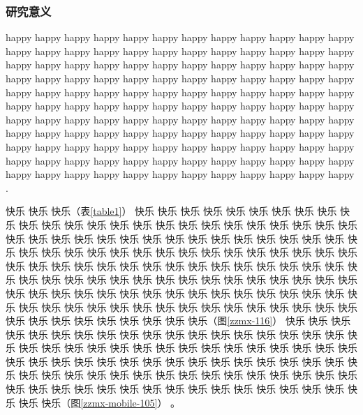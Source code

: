 
\subsubsection{研究意义}

\justifying

\indent\setlength{\parindent}{2em}%

happy happy happy happy happy happy happy happy happy happy happy happy happy happy happy happy happy happy happy happy happy happy happy happy happy happy happy happy happy happy happy happy happy happy happy happy happy happy happy happy happy happy happy happy happy happy happy happy happy happy happy happy happy happy happy happy happy happy happy happy happy happy happy happy happy happy happy happy happy happy happy happy happy happy happy happy happy happy happy happy happy happy happy happy happy happy happy happy happy happy happy happy happy happy happy happy happy happy happy happy happy happy happy happy happy happy happy happy happy happy happy happy happy happy happy happy happy happy happy happy happy happy happy happy happy happy happy happy happy happy happy happy \cite{John1997}.

快乐 快乐 快乐（表\ref{table1}） 快乐 快乐 快乐 快乐 快乐 快乐 快乐 快乐 快乐 快乐 快乐 快乐 快乐 快乐 快乐 快乐 快乐 快乐 快乐 快乐 快乐 快乐 快乐 快乐 快乐 快乐 快乐 快乐 快乐 快乐 快乐 快乐 快乐 快乐 快乐 快乐 快乐 快乐 快乐 快乐 快乐 快乐 快乐 快乐 快乐 快乐 快乐 快乐 快乐 快乐 快乐 快乐 快乐 快乐 快乐 快乐 快乐 快乐 快乐 快乐 快乐 快乐 快乐 快乐 快乐 快乐 快乐 快乐 快乐 快乐 快乐 快乐 快乐 快乐 快乐 快乐 快乐 快乐 快乐 快乐 快乐 快乐 快乐 快乐 快乐 快乐 快乐 快乐 快乐 快乐 快乐 快乐 快乐 快乐 快乐 快乐 快乐 快乐 快乐 快乐 快乐 快乐 快乐 快乐 快乐 快乐 快乐 快乐 快乐 快乐 快乐 快乐 快乐 快乐 快乐 快乐 快乐 快乐 快乐 快乐 快乐 快乐 快乐 快乐 快乐 快乐 快乐（图\ref{zzmx-116}） 快乐 快乐 快乐 快乐 快乐 快乐 快乐 快乐 快乐 快乐 快乐 快乐 快乐 快乐 快乐 快乐 快乐 快乐 快乐 快乐 快乐 快乐 快乐 快乐 快乐 快乐 快乐 快乐 快乐 快乐 快乐 快乐 快乐 快乐 快乐 快乐 快乐 快乐 快乐 快乐 快乐 快乐 快乐 快乐 快乐 快乐 快乐 快乐 快乐 快乐 快乐 快乐 快乐 快乐 快乐 快乐 快乐 快乐 快乐 快乐 快乐 快乐 快乐 快乐 快乐 快乐 快乐 快乐 快乐 快乐 快乐 快乐 快乐 快乐 快乐 快乐 快乐 快乐 快乐 快乐 快乐 快乐 快乐（图\ref{zzmx-mobile-105}） 。



